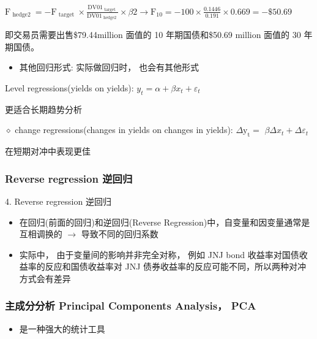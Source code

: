 \({\mathrm{F}}_{\text{ hedge2 }} =  - {\mathrm{F}}_{\text{ target }} \times  \frac{{\mathrm{{DV01}}}_{\text{ target }}}{{\mathrm{{DV01}}}_{\text{ hedge2 }}} \times  {\beta 2} \rightarrow  {\mathrm{F}}_{10} =  - {100} \times  \frac{0.1446}{0.191} \times  {0.669} =  - \$ {50.69}\)

即交易员需要出售\$79.44million 面值的 10 年期国债和\$50.69 million 面值的 30 年期国债。

\begin{itemize}
\item 其他回归形式: 实际做回归时， 也会有其他形式
\end{itemize}

 Level regressions(yields on yields): \({y}_{t} = \alpha  + \beta {x}_{t} + {\varepsilon }_{t}\)

更适合长期趋势分析

\(\diamond\) change regressions(changes in yields on changes in yields): \(\Delta {\mathrm{y}}_{\mathrm{t}} =\)  \({\beta \Delta }{x}_{t} + \Delta {\varepsilon }_{t}\)

在短期对冲中表现更佳


\subsubsection{ Reverse regression 逆回归}

4. Reverse regression 逆回归

\begin{itemize}
\item 在回归(前面的回归)和逆回归(Reverse Regression)中，自变量和因变量通常是互相调换的 \(\rightarrow\) 导致不同的回归系数
\end{itemize}

\begin{itemize}
\item 实际中， 由于变量间的影响并非完全对称， 例如 JNJ bond 收益率对国债收益率的反应和国债收益率对 JNJ 债券收益率的反应可能不同，所以两种对冲方式会有差异
\end{itemize}


\subsubsection{主成分分析 Principal Components Analysis， PCA}


\begin{itemize}
\item 是一种强大的统计工具
\end{itemize}

